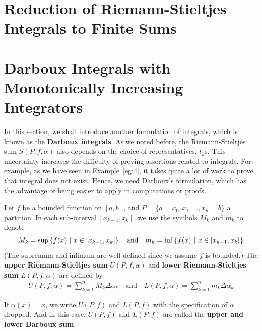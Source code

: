\documentclass[thmcnt=section, 12pt]{my-elegantbook}
\begin{document}

\section{Reduction of Riemann-Stieltjes Integrals to Finite Sums}



\section{Darboux Integrals with Monotonically Increasing Integrators}

In this section, we shall introduce another formulation of integrals, which is known as the \textbf{Darboux integrals}. As we noted before, the Riemann-Stieltjes sum $S(P,f,\alpha)$ also depends on the choice of representatives, $ t_k$s. This uncertainty increases the difficulty of proving assertions related to integrals. For example, as we have seen in Example~\ref{eg:4}, it takes quite a lot of work to prove that integral does not exist. Hence, we need Darboux's formulation, which has the advantage of being easier to apply in computations or proofs.

\begin{definition} \label{def:2}
    Let $f$ be a bounded function on $[a, b]$, and $P = \{a=x_0, x_1, \ldots, x_n=b\}$ a partition. In each sub-interval $[x_{k-1}, x_k]$, we use the symbols $M_k$ and $m_k$ to denote
    \begin{align*}
        M_k = \sup\left\{ f(x) \ \middle| \ x \in [x_{k-1}, x_k] \right\}
        \quad\text{and}\quad
        m_k = \inf\left\{ f(x) \ \middle| \ x \in [x_{k-1}, x_k] \right\}
    \end{align*}
    (The supremum and infimum are well-defined since we assume $f$ is bounded.) The \textbf{upper Riemann-Stieltjes sum} $U(P,f,\alpha)$ and \textbf{lower Riemann-Stieltjes sum} $L(P,f,\alpha)$ are defined by
    \begin{align*}
        U(P,f,\alpha) = \sum_{k=1}^n M_k \Delta \alpha_k
        \quad\text{and}\quad
        L(P,f,\alpha) = \sum_{k=1}^n m_k \Delta \alpha_k
    \end{align*}
\end{definition}

If $\alpha(x) = x$, we write $U(P,f)$ and $L(P,f)$ with the specification of $\alpha$ dropped. And in this case, $U(P,f)$ and $L(P,f)$ are called the \textbf{upper and lower Darboux sum}.
\end{document}
